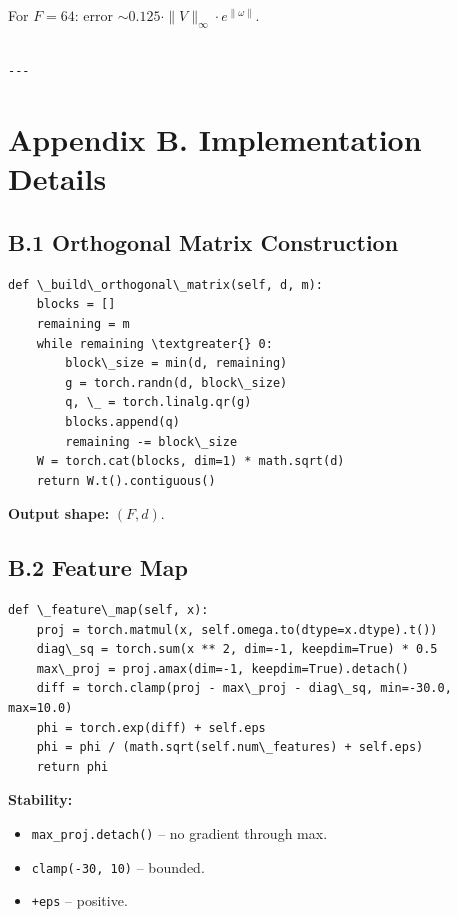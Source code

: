 For $F = 64$: error $\sim 0.125 \cdot \|V\|_\infty \cdot e^{\|\omega\|}$.
\begin{lstlisting}

---
\end{lstlisting}


\section{Appendix B. Implementation Details}

\subsection{B.1 Orthogonal Matrix Construction}

\begin{lstlisting}
def \_build\_orthogonal\_matrix(self, d, m):
    blocks = []
    remaining = m
    while remaining \textgreater{} 0:
        block\_size = min(d, remaining)
        g = torch.randn(d, block\_size)
        q, \_ = torch.linalg.qr(g)
        blocks.append(q)
        remaining -= block\_size
    W = torch.cat(blocks, dim=1) * math.sqrt(d)
    return W.t().contiguous()
\end{lstlisting}

\textbf{Output shape:} $(F, d)$.

\subsection{B.2 Feature Map}

\begin{lstlisting}
def \_feature\_map(self, x):
    proj = torch.matmul(x, self.omega.to(dtype=x.dtype).t())
    diag\_sq = torch.sum(x ** 2, dim=-1, keepdim=True) * 0.5
    max\_proj = proj.amax(dim=-1, keepdim=True).detach()
    diff = torch.clamp(proj - max\_proj - diag\_sq, min=-30.0, max=10.0)
    phi = torch.exp(diff) + self.eps
    phi = phi / (math.sqrt(self.num\_features) + self.eps)
    return phi
\end{lstlisting}

\textbf{Stability:}
\begin{itemize}
\item \texttt{max\_proj.detach()} -- no gradient through max.
\item \texttt{clamp(-30, 10)} -- bounded.
\item \texttt{+eps} -- positive.

\end{itemize}
